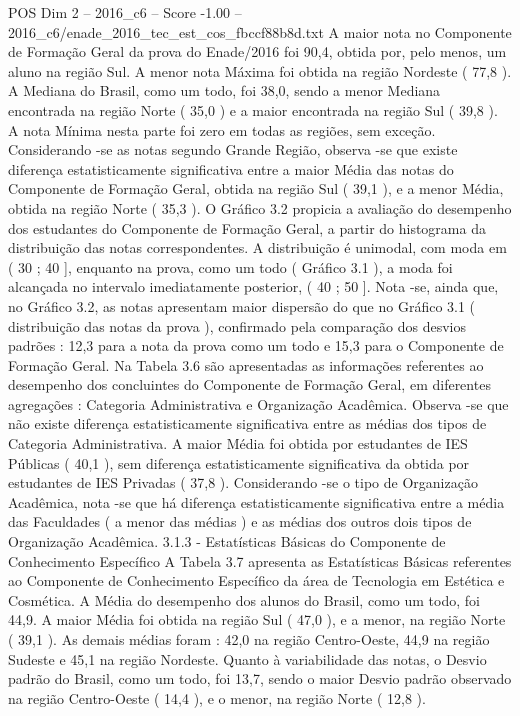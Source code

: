 \begin{textsample}{POS Dim 2 – 2016\_c6 – Score -1.00 – 2016\_c6/enade\_2016\_tec\_est\_cos\_fbccf88b8d.txt}
A maior nota no Componente de Formação Geral da prova do Enade/2016 foi 90,4, obtida por, pelo menos, um aluno na região Sul.
A menor nota Máxima foi obtida na região Nordeste ( 77,8 ).
A Mediana do Brasil, como um todo, foi 38,0, sendo a menor Mediana encontrada na região Norte ( 35,0 ) e a maior encontrada na região Sul ( 39,8 ).
A nota Mínima nesta parte foi zero em todas as regiões, sem exceção.
Considerando -se as notas segundo Grande Região, observa -se que existe diferença estatisticamente significativa entre a maior Média das notas do Componente de Formação Geral, obtida na região Sul ( 39,1 ), e a menor Média, obtida na região Norte ( 35,3 ).
O Gráfico 3.2 propicia a avaliação do desempenho dos estudantes do Componente de Formação Geral, a partir do histograma da distribuição das notas correspondentes.
A distribuição é unimodal, com moda em ( 30 ; 40 ], enquanto na prova, como um todo ( Gráfico 3.1 ), a moda foi alcançada no intervalo imediatamente posterior, ( 40 ; 50 ].
Nota -se, ainda que, no Gráfico 3.2, as notas apresentam maior dispersão do que no Gráfico 3.1 ( distribuição das notas da prova ), confirmado pela comparação dos desvios padrões : 12,3 para a nota da prova como um todo e 15,3 para o Componente de Formação Geral.
Na Tabela 3.6 são apresentadas as informações referentes ao desempenho dos concluintes do Componente de Formação Geral, em diferentes agregações : Categoria Administrativa e Organização Acadêmica.
Observa -se que não existe diferença estatisticamente significativa entre as médias dos tipos de Categoria Administrativa.
A maior Média foi obtida por estudantes de IES Públicas ( 40,1 ), sem diferença estatisticamente significativa da obtida por estudantes de IES Privadas ( 37,8 ).
Considerando -se o tipo de Organização Acadêmica, nota -se que há diferença estatisticamente significativa entre a média das Faculdades ( a menor das médias ) e as médias dos outros dois tipos de Organização Acadêmica. 3.1.3 - Estatísticas Básicas do Componente de Conhecimento Específico A Tabela 3.7 apresenta as Estatísticas Básicas referentes ao Componente de Conhecimento Específico da área de Tecnologia em Estética e Cosmética.
A Média do desempenho dos alunos do Brasil, como um todo, foi 44,9.
A maior Média foi obtida na região Sul ( 47,0 ), e a menor, na região Norte ( 39,1 ).
As demais médias foram : 42,0 na região Centro-Oeste, 44,9 na região Sudeste e 45,1 na região Nordeste.
Quanto à variabilidade das notas, o Desvio padrão do Brasil, como um todo, foi 13,7, sendo o maior Desvio padrão observado na região Centro-Oeste ( 14,4 ), e o menor, na região Norte ( 12,8 ).

\end{textsample}
